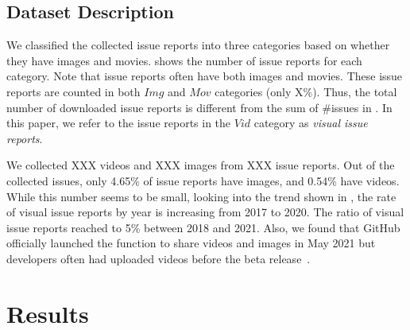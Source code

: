 \subsection{Dataset Description}

We classified the collected issue reports into three categories based on whether they have images and movies.  shows the number of issue reports for each category. 
Note that issue reports often have both images and movies. 
These issue reports are counted in both $Img$ and $Mov$ categories (only X\%). 
Thus, the total number of downloaded issue reports is different from the sum of \#issues in . 
In this paper, we refer to the issue reports in the $Vid$ category 
as \textit{visual issue reports}. 


We collected XXX videos and XXX images from XXX issue reports. Out of the collected issues, only 4.65\% of issue reports have images, and 0.54\% have videos. While this number seems to be small, looking into the trend shown in , the rate of visual issue reports by year is increasing from 2017 to 2020. The ratio of visual issue reports reached to 5\% between 2018 and 2021. Also, we found that GitHub officially launched the function to share videos and images in May 2021 but developers often had uploaded videos before the beta release~\citep{github-video-blog}. 


\section{Results}
\label{sec:results}

% 

